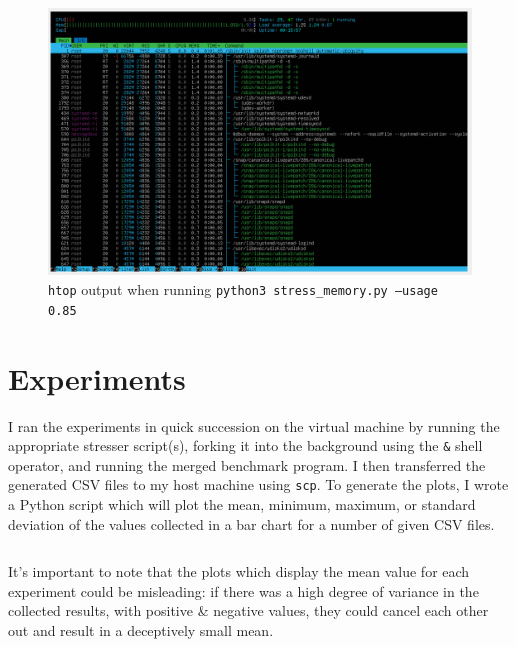 \documentclass[a4paper]{article}
\newenvironment{code}{\captionsetup{type=listing}}{}
\begin{document}
\begin{figure}[H]
    \centering
    \includegraphics[width=\textwidth]{./images/memstress.png}
    \caption{\texttt{htop} output when running \texttt{python3 stress_memory.py --usage 0.85}}
\end{figure}

\section{Experiments}
I ran the experiments in quick succession on the virtual machine by running the appropriate stresser script(s), forking it into the background using the \texttt{&} shell operator, and running the merged benchmark program.
I then transferred the generated CSV files to my host machine using \texttt{scp}.
To generate the plots, I wrote a Python script which will plot the mean, minimum, maximum, or standard deviation of the values collected in a bar chart for a number of given CSV files.

\begin{code}
\inputminted[linenos, breaklines, frame=single]{python}{../code/plots/barchart.py}
\caption{\texttt{barchart.py}}
\end{code}

It's important to note that the plots which display the mean value for each experiment could be misleading:
if there was a high degree of variance in the collected results, with positive \& negative values, they could cancel each other out and result in a deceptively small mean.
\end{document}
